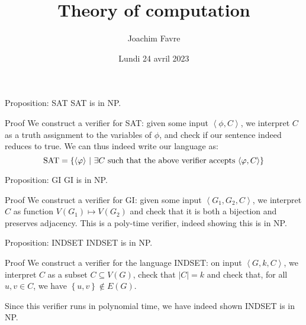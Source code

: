 \documentclass[a4paper]{article}
\title{Theory of computation}
\author{Joachim Favre}
\date{Lundi 24 avril 2023}
\begin{document}
\maketitle


\begin{parag}{Proposition: SAT}
    SAT is in NP.

    \begin{subparag}{Proof}
        We construct a verifier for SAT: given some input $\left\langle \phi, C \right\rangle$, we interpret $C$ as a truth assignment to the variables of $\phi$, and check if our sentence indeed reduces to true. We can thus indeed write our language as: 
        \[\text{SAT} = \left\{\left\langle \phi \right\rangle \suchthat \exists C \text{ such that the above verifier accepts $\left\langle \phi, C \right\rangle$}\right\}\]
    \end{subparag}
\end{parag}

\begin{parag}{Proposition: GI}
    GI is in NP.
    
    \begin{subparag}{Proof}
        We construct a verifier for GI: given some input $\left\langle G_1, G_2, C \right\rangle$, we interpret $C$ as function $V\left(G_1\right) \mapsto V\left(G_2\right)$ and check that it is both a bijection and preserves adjacency. This is a poly-time verifier, indeed showing this is in NP.
    \end{subparag}
\end{parag}

\begin{parag}{Proposition: INDSET}
    INDSET is in NP.

    \begin{subparag}{Proof}
        We construct a verifier for the language INDSET: on input $\left\langle G, k, C \right\rangle$, we interpret $C$ as a subset $C \subseteq V\left(G\right)$, check that $\left|C\right| = k$ and check that, for all $u, v \in C$, we have $\left\{u, v\right\} \not \in E\left(G\right)$.

        Since this verifier runs in polynomial time, we have indeed shown INDSET is in NP.
    \end{subparag}
\end{parag}
\end{document}

